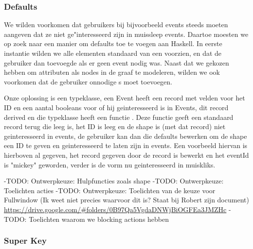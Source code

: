 \subsubsection{Defaults}
We wilden voorkomen dat gebruikers bij bijvoorbeeld events steeds moeten aangeven dat ze niet ge"interesseerd zijn in muissleep events. Daartoe moesten we op zoek naar een manier om defaults toe te voegen aan Haskell. In eerste instantie wilden we alle elementen standaard van een  voorzien, en dat de gebruiker dan  toevoegde als er geen event nodig was. Naast dat we gekozen hebben om attributen als nodes in de graaf te modeleren, wilden we ook voorkomen dat de gebruiker onnodige s moet toevoegen.

Onze oplossing is een  typeklasse, een Event heeft een record met velden voor het ID en een aantal booleans voor of hij geinteresseerd is in Events, dit record derived  en die typeklasse heeft een functie . Deze functie geeft een standaard record terug die leeg is, het ID is leeg en de shape is (met dat record) niet geinteresseerd in events, de gebruiker kan dan die defaults bewerken om de shape een ID te geven en geinteresseerd te laten zijn in events. Een voorbeeld hiervan is hierboven al gegeven, het record gegeven door de  record is bewerkt en het eventId is "mickey" geworden, verder is de vorm nu geinteresseerd in muiskliks.

-TODO: Ontwerpkeuze: Hulpfuncties zoals shape
-TODO: Ontwerpkeuze: Toelichten acties
-TODO: Ontwerpkeuze: Toelichten van de keuze voor Fullwindow (Ik weet niet precies waarvoor dit is? Staat bij Robert zijn document) \url{https://drive.google.com/#folders/0B97Qa5VgdaDNWjBiOGFEa3JMZHc}
-TODO: Toelichten waarom we blocking actions hebben

\subsubsection{Super Key}

